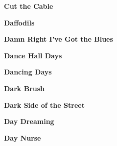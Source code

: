 \newline
\vspace{10pt} 
\begin{center}\textbf{Cut the Cable}\end{center}
\newline
\vspace{10pt} 
\begin{center}\textbf{Daffodils}\end{center}
\newline
\vspace{10pt} 
\begin{center}\textbf{Damn Right I've Got the Blues}\end{center}
\newline
\vspace{10pt} 
\begin{center}\textbf{Dance Hall Days}\end{center}
\newline
\vspace{10pt} 
\begin{center}\textbf{Dancing Days}\end{center}
\newline
\vspace{10pt} 
\begin{center}\textbf{Dark Brush}\end{center}
\newline
\vspace{10pt} 
\begin{center}\textbf{Dark Side of the Street}\end{center}
\newline
\vspace{10pt} 
\begin{center}\textbf{Day Dreaming}\end{center}
\newline
\vspace{10pt} 
\begin{center}\textbf{Day Nurse}\end{center}
\newline
\vspace{10pt} 
